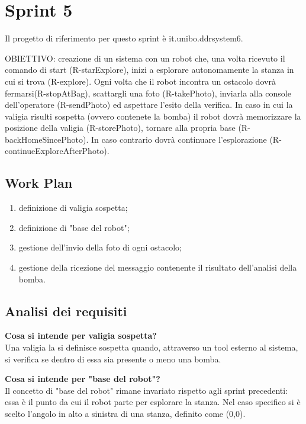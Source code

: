\section{Sprint 5} 

Il progetto di riferimento per questo sprint è it.unibo.ddrsystem6.

OBIETTIVO: creazione di un sistema con un robot che, una volta ricevuto il comando di start (R-starExplore), inizi a esplorare autonomamente la stanza in cui si trova (R-explore). Ogni volta che il robot incontra un ostacolo dovrà fermarsi(R-stopAtBag), scattargli una foto (R-takePhoto), inviarla alla console dell'operatore (R-sendPhoto) ed aspettare l'esito della verifica. In caso in cui la valigia risulti sospetta (ovvero contenete la bomba) il robot dovrà memorizzare la posizione della valigia (R-storePhoto), tornare alla propria base (R-backHomeSincePhoto).
In caso contrario dovrà continuare l'esplorazione (R-continueExploreAfterPhoto).

\subsection{Work Plan}
\begin{enumerate}
\item definizione di valigia sospetta;
\item definizione di "base del robot";
\item gestione dell'invio della foto di ogni ostacolo;
\item gestione della ricezione del messaggio contenente il risultato dell'analisi della bomba.
\end{enumerate}

\subsection{Analisi dei requisiti}

\textbf{Cosa si intende per valigia sospetta?}\\
Una valigia la si definisce sospetta quando, attraverso un tool esterno al sistema, si verifica se dentro di essa sia presente o meno una bomba. 

\textbf{Cosa si intende per "base del robot"?}\\
Il concetto di "base del robot" rimane invariato rispetto agli sprint precedenti: essa è il punto da cui il robot parte per esplorare la stanza. Nel caso specifico si è scelto l'angolo in alto a sinistra di una stanza, definito come (0,0).

